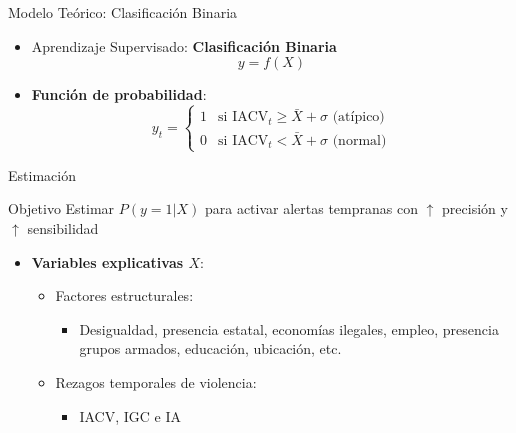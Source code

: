 

\begin{frame}{Modelo Teórico: Clasificación Binaria}

    \begin{itemize}
        \item \alert{Aprendizaje Supervisado}: \textbf{Clasificación Binaria}
        $$y = f(X)$$
        \pause
        \item \textbf{Función de probabilidad}:
        \[
        y_t = \begin{cases} 
            1 & \text{si } \text{IACV}_t \geq \bar{X} + \sigma \text{ (atípico)} \\
            0 & \text{si } \text{IACV}_t < \bar{X} + \sigma \text{ (normal)}
        \end{cases}
        \]
        \end{itemize}
\end{frame}





\begin{frame}{Estimación}
    \begin{alertblock}{Objetivo}
        Estimar \( P(y=1|X) \) para activar alertas tempranas con \( \uparrow \) precisión y \( \uparrow \) sensibilidad
    \end{alertblock}
    \pause
    \begin{itemize}
        \item \textbf{Variables explicativas \( X \)}:
        \pause
        \begin{itemize}
            \item \alert{Factores estructurales}:
            \begin{itemize}
                \footnotesize
                \item Desigualdad, presencia estatal, economías ilegales, empleo, presencia grupos armados, educación, ubicación, etc.
            \end{itemize}
            \pause
            \item \alert{Rezagos temporales de violencia}:
            \begin{itemize}
                \footnotesize
                \item IACV, IGC e IA
            \end{itemize}
        
        \end{itemize}
        \end{itemize}
\end{frame}




